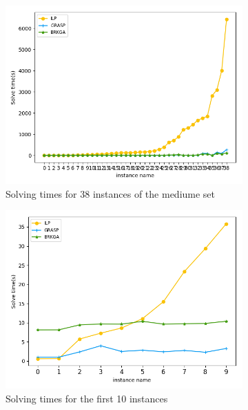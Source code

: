 \begin{figure}[h!]

\begin{subfigure}[b]{.49\linewidth}
\centering
\includegraphics[width=\linewidth]{./img/ILPvsMetah_times.png}
\caption{ Solving times for 38 instances of the mediume set}\label{fig1a}
\end{subfigure}%
\begin{subfigure}[b]{.49\linewidth}
\centering
\includegraphics[width=\linewidth]{./img/ILPvsMetah_times_first10.png}
\caption{ Solving times for the first 10 instances }\label{fig1b}
\end{subfigure}\vfill
\begin{subfigure}[b]{.49\linewidth}

\end{subfigure}
\end{figure}
